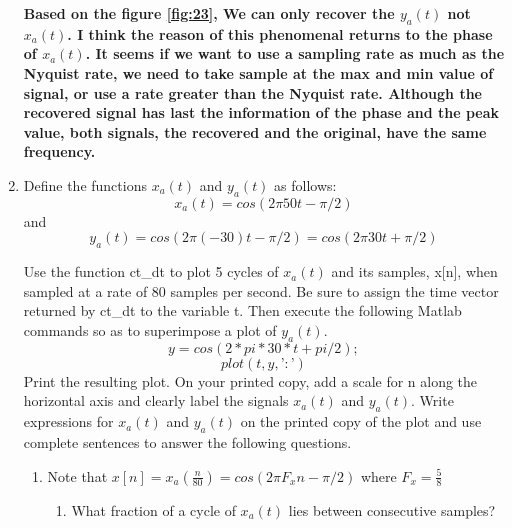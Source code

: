 \documentclass[12pt]{article}
\begin{document}
\begin{enumerate}
\textbf{Based on the figure \ref{fig:23}, We can only recover the $y_a(t)$ not $x_a(t)$. I think the reason of this phenomenal returns to the phase of $x_a(t)$. It seems if we want to use a sampling rate as much as the Nyquist rate, we need to take sample at the max and min value of signal, or use a rate greater than the Nyquist rate. Although the recovered signal has last the information of the phase and the peak value, both signals, the recovered and the original, have the same frequency.}


\item Define the functions $x_a(t)$ and $y_a(t)$ as follows:
$$
x_a(t) = cos(2\pi50t - \pi/2) 
$$
and 
$$
y_a(t) = cos(2\pi(- 30)t - \pi/2) = cos(2\pi30t + \pi/2)
$$

Use the function ct\_dt to plot 5 cycles of $x_a(t)$ and its samples, x[n], when sampled at a rate of 80 samples per second. Be sure to assign the time vector returned by ct\_dt to the variable t. Then execute the following Matlab commands so as to superimpose a plot of $y_a(t)$.
$$
     y = cos(2*pi*30*t + pi/2);
     $$
     $$
     plot(t,y,’:’)
     $$
Print the resulting plot. On your printed copy, add a scale for n along the horizontal axis and clearly label the signals $x_a(t)$ and $y_a(t)$. Write expressions for $x_a(t)$ and $y_a(t)$ on the printed copy of the plot and use complete sentences to answer the following questions.

\begin{enumerate}
\begin{figure}[H]
    \centering
    \begin{minipage}[b]{0.7\textwidth}
        \texttt{[image: images/31.jpg]}
    \end{minipage}
    \caption{The plot of $x_a(t)$, $y_a(t)$, x[n], and y[n].}
    \label{fig:31}
\end{figure}
\item Note that $x[n] = x_a(\frac{n}{80}) = cos(2\pi F_x n-\pi/2)$ where $F_x = \frac{5}{8}$
\begin{enumerate}



\item What fraction of a cycle of $x_a(t)$ lies between consecutive samples?


\end{enumerate}
\end{enumerate}
\end{enumerate}
\end{document}
